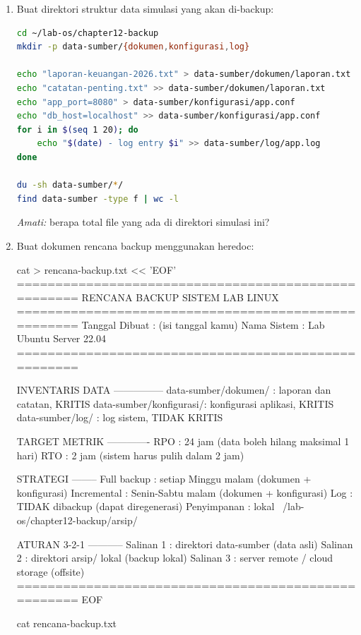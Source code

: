 \begin{enumerate}
    \item Buat direktori struktur data simulasi yang akan di-backup:
\begin{lstlisting}[language=bash, caption={Menyiapkan direktori dan data simulasi}]
cd ~/lab-os/chapter12-backup
mkdir -p data-sumber/{dokumen,konfigurasi,log}

echo "laporan-keuangan-2026.txt" > data-sumber/dokumen/laporan.txt
echo "catatan-penting.txt" >> data-sumber/dokumen/laporan.txt
echo "app_port=8080" > data-sumber/konfigurasi/app.conf
echo "db_host=localhost" >> data-sumber/konfigurasi/app.conf
for i in $(seq 1 20); do
    echo "$(date) - log entry $i" >> data-sumber/log/app.log
done

du -sh data-sumber/*/
find data-sumber -type f | wc -l
\end{lstlisting}
    \textit{Amati:} berapa total file yang ada di direktori simulasi ini?

    \item Buat dokumen rencana backup menggunakan heredoc:
\begin{longlisting}[language=bash, caption={Membuat rencana backup dengan heredoc}]
cat > rencana-backup.txt << 'EOF'
====================================================
RENCANA BACKUP SISTEM LAB LINUX
====================================================
Tanggal Dibuat : (isi tanggal kamu)
Nama Sistem    : Lab Ubuntu Server 22.04
====================================================

INVENTARIS DATA
---------------
data-sumber/dokumen/    : laporan dan catatan, KRITIS
data-sumber/konfigurasi/: konfigurasi aplikasi, KRITIS
data-sumber/log/        : log sistem, TIDAK KRITIS

TARGET METRIK
-------------
RPO : 24 jam (data boleh hilang maksimal 1 hari)
RTO : 2 jam  (sistem harus pulih dalam 2 jam)

STRATEGI
--------
Full backup    : setiap Minggu malam (dokumen + konfigurasi)
Incremental    : Senin-Sabtu malam (dokumen + konfigurasi)
Log            : TIDAK dibackup (dapat diregenerasi)
Penyimpanan    : lokal ~/lab-os/chapter12-backup/arsip/

ATURAN 3-2-1
-----------
Salinan 1 : direktori data-sumber (data asli)
Salinan 2 : direktori arsip/ lokal (backup lokal)
Salinan 3 : server remote / cloud storage (offsite)
====================================================
EOF

cat rencana-backup.txt
\end{longlisting}


\end{enumerate}
